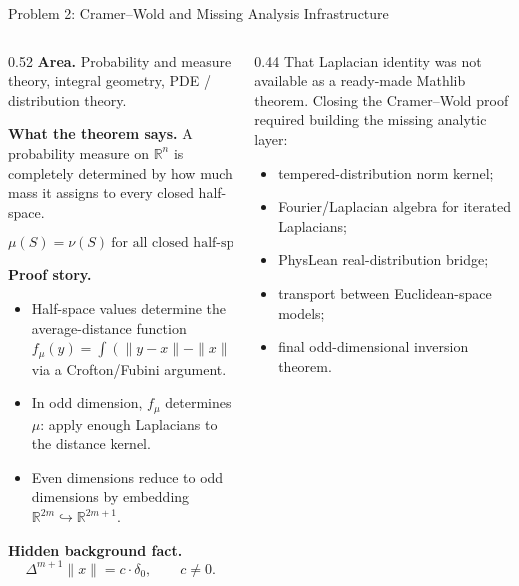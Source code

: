 \documentclass[aspectratio=169,10pt]{beamer}
\newcommand{\mathlib}{Mathlib\xspace}
\begin{document}
\begin{frame}[t]{Problem 2: Cramer--Wold and Missing Analysis Infrastructure}
\begin{columns}[T,onlytextwidth]
  \begin{column}{0.52\textwidth}
    \scriptsize
    \textbf{Area.} Probability and measure theory, integral geometry, PDE /
    distribution theory.

    \textbf{What the theorem says.}
    A probability measure on \(\mathbb{R}^n\) is completely determined by how
    much mass it assigns to every closed half-space.

    \[
      \mu(S)=\nu(S)\ \text{for all closed half-spaces }S
      \quad\Longrightarrow\quad
      \mu=\nu
    \]

    \textbf{Proof story.}
    \begin{itemize}
      \item Half-space values determine the average-distance function
        \(f_\mu(y)=\int(\|y-x\|-\|x\|)\,d\mu(x)\) via a Crofton/Fubini argument.
      \item In odd dimension, \(f_\mu\) determines \(\mu\): apply enough
        Laplacians to the distance kernel.
      \item Even dimensions reduce to odd dimensions by embedding
        \(\mathbb{R}^{2m}\hookrightarrow\mathbb{R}^{2m+1}\).
    \end{itemize}

    \textbf{Hidden background fact.}
    \[
      \Delta^{m+1}\lVert x\rVert = c\cdot \delta_0,\qquad c\neq 0.
    \]
  \end{column}
  \begin{column}{0.44\textwidth}
    \scriptsize
    That Laplacian identity was not available as a ready-made \mathlib theorem.
    Closing the Cramer--Wold proof required building the missing analytic layer:
    \begin{itemize}
      \item tempered-distribution norm kernel;
      \item Fourier/Laplacian algebra for iterated Laplacians;
      \item PhysLean real-distribution bridge;
      \item transport between Euclidean-space models;
      \item final odd-dimensional inversion theorem.
    \end{itemize}

  \end{column}
\end{columns}
\end{frame}
\end{document}
